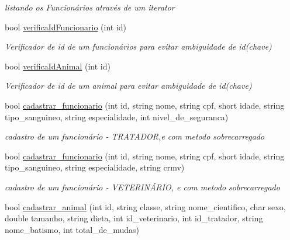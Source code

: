 \begin{DoxyCompactItemize}
\begin{DoxyCompactList}\small\item\em listando os Funcionários através de um iterator \end{DoxyCompactList}\item 
\mbox{\label{class_sistema_a44074e27354dd4a14df69c9cbef9e1bf}} 
bool \mbox{\hyperlink{class_sistema_a44074e27354dd4a14df69c9cbef9e1bf}{verifica\+Id\+Funcionario}} (int id)
\begin{DoxyCompactList}\small\item\em Verificador de id de um funcionários para evitar ambiguidade de id(chave) \end{DoxyCompactList}\item 
\mbox{\label{class_sistema_a8029cb8e3c198b07caa80ecc6293d5b0}} 
bool \mbox{\hyperlink{class_sistema_a8029cb8e3c198b07caa80ecc6293d5b0}{verifica\+Id\+Animal}} (int id)
\begin{DoxyCompactList}\small\item\em Verificador de id de um animal para evitar ambiguidade de id(chave) \end{DoxyCompactList}\item 
bool \mbox{\hyperlink{class_sistema_aabbe1927854b5a8b17a98b6cabdb7ff3}{cadastrar\+\_\+funcionario}} (int id, string nome, string cpf, short idade, string tipo\+\_\+sanguineo, string especialidade, int nivel\+\_\+de\+\_\+seguranca)
\begin{DoxyCompactList}\small\item\em cadastro de um funcionário -\/ T\+R\+A\+T\+A\+D\+OR,e com metodo sobrecarregado \end{DoxyCompactList}\item 
bool \mbox{\hyperlink{class_sistema_a1cb053a5708ed71b300417b00d4fa849}{cadastrar\+\_\+funcionario}} (int id, string nome, string cpf, short idade, string tipo\+\_\+sanguineo, string especialidade, string crmv)
\begin{DoxyCompactList}\small\item\em cadastro de um funcionário -\/ V\+E\+T\+E\+R\+I\+NÁ\+R\+IO, e com metodo sobrecarregado \end{DoxyCompactList}\item 
bool \mbox{\hyperlink{class_sistema_a5435a4ad49076bda8dd91387093b9268}{cadastrar\+\_\+animal}} (int id, string classe, string nome\+\_\+cientifico, char sexo, double tamanho, string dieta, int id\+\_\+veterinario, int id\+\_\+tratador, string nome\+\_\+batismo, int total\+\_\+de\+\_\+mudas)

\end{DoxyCompactItemize}
